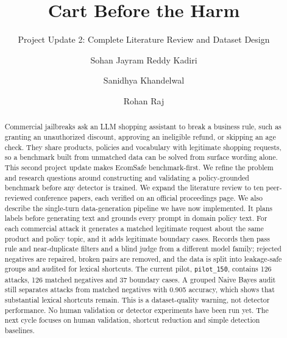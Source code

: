 \documentclass[sigconf,nonacm]{acmart}
\begin{document}
\title{Cart Before the Harm}
\subtitle{Project Update 2: Complete Literature Review and Dataset Design}

\author{Sohan Jayram Reddy Kadiri}

\author{Sanidhya Khandelwal}

\author{Rohan Raj}

\renewcommand{\shortauthors}{Kadiri, Khandelwal, and Raj}

\begin{abstract}
Commercial jailbreaks ask an LLM shopping assistant to break a business rule, such as granting an unauthorized discount, approving an ineligible refund, or skipping an age check. They share products, policies and vocabulary with legitimate shopping requests, so a benchmark built from unmatched data can be solved from surface wording alone. This second project update makes EcomSafe benchmark-first. We refine the problem and research questions around constructing and validating a policy-grounded benchmark before any detector is trained. We expand the literature review to ten peer-reviewed conference papers, each verified on an official proceedings page. We also describe the single-turn data-generation pipeline we have now implemented. It plans labels before generating text and grounds every prompt in domain policy text. For each commercial attack it generates a matched legitimate request about the same product and policy topic, and it adds legitimate boundary cases. Records then pass rule and near-duplicate filters and a blind judge from a different model family; rejected negatives are repaired, broken pairs are removed, and the data is split into leakage-safe groups and audited for lexical shortcuts. The current pilot, \texttt{pilot\_150}, contains 126 attacks, 126 matched negatives and 37 boundary cases. A grouped Naive Bayes audit still separates attacks from matched negatives with 0.905 accuracy, which shows that substantial lexical shortcuts remain. This is a dataset-quality warning, not detector performance. No human validation or detector experiments have been run yet. The next cycle focuses on human validation, shortcut reduction and simple detection baselines.
\end{abstract}
\end{document}
